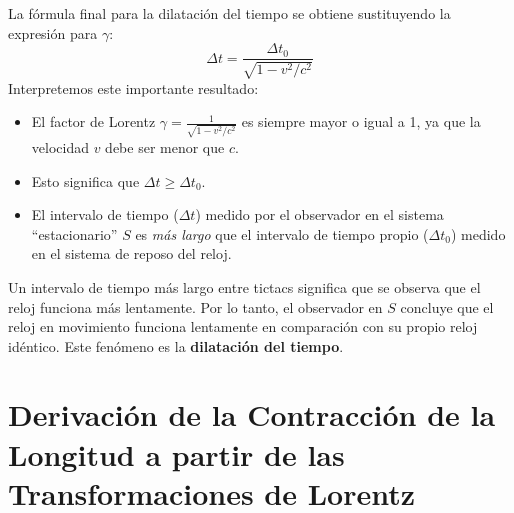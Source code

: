 \documentclass[11pt,a4paper]{book}
\begin{document}
La fórmula final para la dilatación del tiempo se obtiene sustituyendo la expresión para $\gamma$:
\[ \boxed{ \Delta t = \frac{\Delta t_0}{\sqrt{1 - v^2/c^2}} } \]
Interpretemos este importante resultado:
\begin{itemize}
    \item El factor de Lorentz $\gamma = \frac{1}{\sqrt{1 - v^2/c^2}}$ es siempre mayor o igual a 1, ya que la velocidad $v$ debe ser menor que $c$.
    \item Esto significa que $\Delta t \ge \Delta t_0$.
    \item El intervalo de tiempo ($\Delta t$) medido por el observador en el sistema ``estacionario'' $S$ es \textit{más largo} que el intervalo de tiempo propio ($\Delta t_0$) medido en el sistema de reposo del reloj.
\end{itemize}
Un intervalo de tiempo más largo entre tictacs significa que se observa que el reloj funciona más lentamente. Por lo tanto, el observador en $S$ concluye que el reloj en movimiento funciona lentamente en comparación con su propio reloj idéntico. Este fenómeno es la \textbf{dilatación del tiempo}.


\section{Derivación de la Contracción de la Longitud a partir de las Transformaciones de Lorentz}
\end{document}
